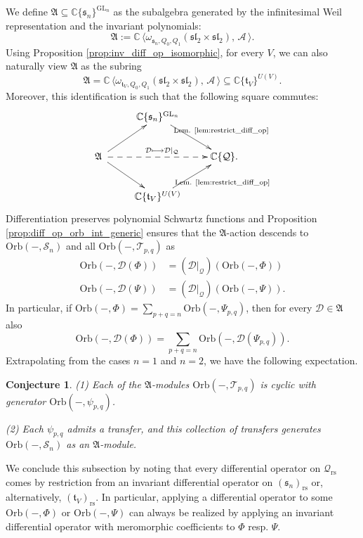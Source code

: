 \documentclass[reqno, 11pt]{amsart} %
\numberwithin{equation}{section}
\theoremstyle{plain}
\newtheorem{conjecture}[theorem]{Conjecture}
\theoremstyle{definition}
\theoremstyle{remark}
\newcommand{\mr}{\mathrm}
\newcommand{\mbC}{\mathbb{C}}
\newcommand{\mcA}{\mathcal{A}}
\newcommand{\mcD}{\mathcal{D}}
\newcommand{\mcQ}{\mathcal{Q}}
\newcommand{\mcS}{\mathcal{S}}
\newcommand{\mcT}{\mathcal{T}}
\newcommand{\mfA}{\mathfrak{A}}
\newcommand{\mfl}{\mathfrak{l}}
\newcommand{\mfs}{\mathfrak{s}}
\newcommand{\mft}{\mathfrak{t}}
\newcommand{\rs}{\mr{rs}}
\newcommand{\mfsl}{\mfs\mfl}
\newcommand{\lie}[1]{ \mathfrak{#1}}
\DeclareMathOperator{\GL}{GL}
\newcommand{\Orb}{\mathrm{Orb}}
\newcommand{\mn}{\medskip \noindent}
\begin{document}
We define $\mfA \subseteq \mbC\{\mfs_n\}^{\GL_n}$ as the subalgebra generated by the infinitesimal Weil representation and the invariant polynomials:
\begin{equation}\label{eq:def_A_fat}
\mfA := \mbC\,\big\langle ω_{\mfs_n,Q_0,Q_1}(\mfsl_2 \times \mfsl_2),\, \mcA\,\big\rangle.
\end{equation}
Using Proposition \ref{prop:inv_diff_op_isomorphic}, for every $V$, we can also naturally view $\mfA$ as the subring
\begin{equation}\label{eq:A_fat_on_unitary_side}
\mfA = \mbC\,\big\langle ω_{\mft_V,Q_0,Q_1}(\mfsl_2 \times \mfsl_2),\, \mcA\,\big\rangle \subseteq \mbC\{\mft_V\}^{U(V)}.
\end{equation}
Moreover, this identification is such that the following square commutes:
\begin{equation}\label{eq:comm_square_A_fat}
\xymatrix{
& \mbC\{\mfs_n\}^{\GL_n} \ar[rd]^-{\text{Lem. \ref{lem:restrict_diff_op}}} & \\
\mfA\ \ar[ru] \ar[rd] \ar@{-->}[rr]^{\mcD\longmapsto \mcD\vert_\mcQ} & & \mbC\{\mcQ\}.\\
& \mbC\{\mft_V\}^{U(V)} \ar[ru]_-{\text{Lem. \ref{lem:restrict_diff_op}}} &
}
\end{equation}
Differentiation preserves polynomial Schwartz functions and Proposition \ref{prop:diff_op_orb_int_generic} ensures that the $\mfA$-action descends to $\Orb(-, \mcS_n)$ and all $\Orb(-,\mcT_{p,q})$ as
$$\begin{aligned}
\Orb(-,\mcD(Φ)) & = (\mcD\vert_\mcQ)(\Orb(-,Φ))\\
\Orb(-,\mcD(Ψ)) & = (\mcD\vert_\mcQ)(\Orb(-,Ψ)).
\end{aligned}$$
In particular, if $\Orb(-,Φ) = \sum_{p+q = n} \Orb(-,Ψ_{p,q})$, then for every $\mcD\in \mfA$ also
\begin{equation}\label{eq:compatib_transfer_mfA}
\Orb(-,\mcD(Φ)) = \sum_{p+q = n} \Orb(-,\mcD(Ψ_{p,q})).
\end{equation}
Extrapolating from the cases $n = 1$ and $n = 2$, we have the following expectation.

\begin{conjecture}\label{conj:cyclic_Orb} (1) Each of the $\mfA$-modules $\Orb(-,\mcT_{p,q})$ is cyclic with generator $\Orb(-,ψ_{p,q})$.

\mn (2) Each $\psi_{p,q}$ admits a transfer, and this collection of transfers generates $\Orb(-,\mcS_n)$ as an $\mfA$-module.
\end{conjecture}
We conclude this subsection by noting that every differential operator on $\mcQ_\rs$ comes by restriction from an invariant differential operator on $(\lie s_n)_\rs$ or, alternatively, $(\lie t_V)_\rs$. In particular, applying a differential operator to some $\Orb(-,Φ)$ or $\Orb(-,Ψ)$ can always be realized by applying an invariant differential operator with meromorphic coefficients to $Φ$ resp. $Ψ$.
\end{document}
